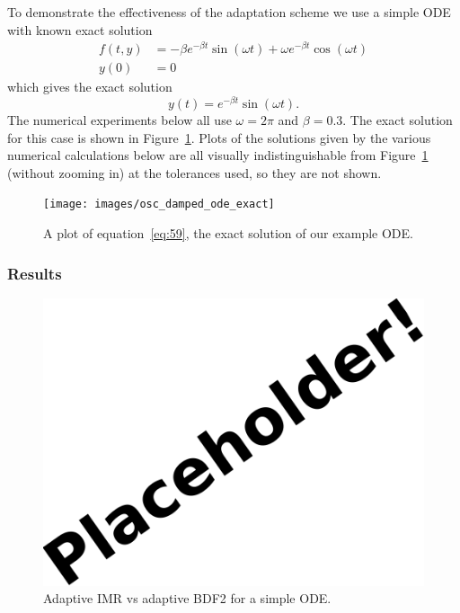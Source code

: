 To demonstrate the effectiveness of the adaptation scheme we use a simple ODE with known exact solution
\begin{align}
  f(t,y) &= - \beta e^{-\beta t} \sin(\omega t) + \omega e^{-\beta t} \cos(\omega t) \\
  y(0) &= 0
\end{align}
which gives the exact solution
\begin{equation}
  \label{eq:59}
  y(t) = e^{-\beta t} \sin(\omega t).
\end{equation}
The numerical experiments below all use $\omega = 2 \pi$ and $\beta = 0.3$.
The exact solution for this case is shown in Figure~\ref{fig:mp-ode-exact}.
Plots of the solutions given by the various numerical calculations below are all visually indistinguishable from Figure~\ref{fig:mp-ode-exact} (without zooming in) at the tolerances used, so they are not shown.


\begin{figure}[ht!]
  \centering
  \texttt{[image: images/osc\_damped\_ode\_exact]}
  \caption{A plot of equation~\eqref{eq:59}, the exact solution of our example ODE.}
  \label{fig:mp-ode-exact}
\end{figure}

\subsubsection{Results}

\begin{figure}[ht!]
  \centering
  \includegraphics{images/placeholder}
  \caption{Adaptive IMR vs adaptive BDF2 for a simple ODE.}
  \label{fig:mp-vs-bdf2}
\end{figure}

